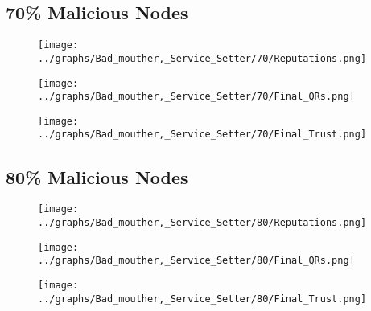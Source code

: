 \documentclass{article}
\begin{document}
  \begin{minipage}[t]{0.49\columnwidth}
    \subsection*{70\% Malicious Nodes}
        \begin{figure}[H]
            \centering
            \texttt{[image: ../graphs/Bad\_mouther,\_Service\_Setter/70/Reputations.png]}
        \end{figure}
        \begin{figure}[H]
            \centering
            \texttt{[image: ../graphs/Bad\_mouther,\_Service\_Setter/70/Final\_QRs.png]}
        \end{figure}
    \end{minipage}
    \begin{minipage}[t]{0.49\columnwidth}
        \begin{figure}[H]
            \centering
            \texttt{[image: ../graphs/Bad\_mouther,\_Service\_Setter/70/Final\_Trust.png]}
        \end{figure}
    \end{minipage}

  \begin{minipage}[t]{0.49\columnwidth}
    \subsection*{80\% Malicious Nodes}
        \begin{figure}[H]
            \centering
            \texttt{[image: ../graphs/Bad\_mouther,\_Service\_Setter/80/Reputations.png]}
        \end{figure}
        \begin{figure}[H]
            \centering
            \texttt{[image: ../graphs/Bad\_mouther,\_Service\_Setter/80/Final\_QRs.png]}
        \end{figure}
    \end{minipage}
    \begin{minipage}[t]{0.49\columnwidth}
        \begin{figure}[H]
            \centering
            \texttt{[image: ../graphs/Bad\_mouther,\_Service\_Setter/80/Final\_Trust.png]}
        \end{figure}
    \end{minipage}
\end{document}
